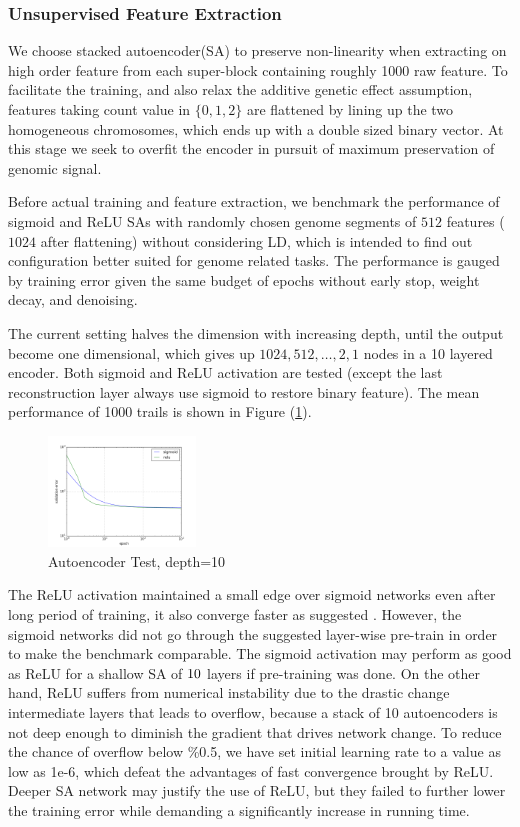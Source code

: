 \documentclass[acmtog, authorversion]{acmart}
\begin{document}
\subsubsection{Unsupervised Feature Extraction}
We choose stacked autoencoder(SA) \cite{DL:SDA1} to preserve non-linearity when extracting on high order feature from each super-block containing roughly 1000 raw feature. To facilitate the training, and also relax the additive genetic effect assumption, features taking count value in $\{0, 1, 2\}$ are flattened by lining up the two homogeneous chromosomes, which ends up with a double sized binary vector. At this stage we seek to overfit the encoder in pursuit of maximum preservation of genomic signal.

Before actual training and feature extraction, we benchmark the performance of sigmoid and ReLU SAs with randomly chosen genome segments of $512$ features ($1024$ after flattening) without considering LD, which is intended to find out configuration better suited for genome related tasks. The performance is gauged by training error given the same budget of epochs without early stop, weight decay, and denoising.

The current setting halves the dimension with increasing depth, until the output become one dimensional, which gives up $1024, 512, \dots, 2, 1$ nodes in a 10 layered encoder. Both sigmoid and ReLU activation are tested (except the last reconstruction layer always use sigmoid to restore binary feature). The mean performance of 1000 trails is shown in Figure (\ref{fig:ae0}).
\begin{figure}[h]
  \centering
  \includegraphics[width=0.35\textwidth]{img/00}
  \caption{Autoencoder Test, depth=10}
  \label{fig:ae0}
\end{figure}
The  ReLU activation maintained a small edge over sigmoid networks even after long period of training, it also converge faster as suggested \cite{DL:Relu1}. However, the sigmoid networks did not go through the suggested layer-wise pre-train \cite{DL:Intro1} in order to make the benchmark comparable. The sigmoid activation may perform as good as ReLU for a shallow SA of $10 \time 2$ layers if pre-training was done. On the other hand, ReLU suffers from numerical instability due to the drastic change intermediate layers that leads to overflow, because a stack of 10 autoencoders is not deep enough to diminish the gradient that drives network change. To reduce the chance of overflow below \%0.5, we have set initial learning rate to a value as low as 1e-6, which defeat the advantages of fast convergence brought by ReLU. Deeper SA network may justify the use of ReLU, but they failed to further lower the training error while demanding a significantly increase in running time. 
\end{document}
